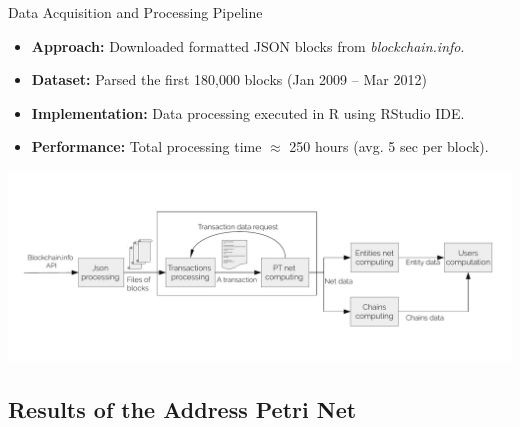 \documentclass{beamer}
\begin{document}
\begin{frame}{Data Acquisition and Processing Pipeline}
    \footnotesize
    \begin{itemize}
        \item \textbf{Approach:} Downloaded formatted JSON blocks from \textit{blockchain.info}.
        \item \textbf{Dataset:} Parsed the first 180,000 blocks (Jan 2009 -- Mar 2012)
        \item \textbf{Implementation:} Data processing executed in R using RStudio IDE.
        \item \textbf{Performance:} Total processing time $\approx$ 250 hours (avg. 5 sec per block).
    \end{itemize}
    \vspace{0.3cm}
    \centering
    \includegraphics[width=1\linewidth]{diagram}
\end{frame}

\subsection{Results of the Address Petri Net}
\end{document}
